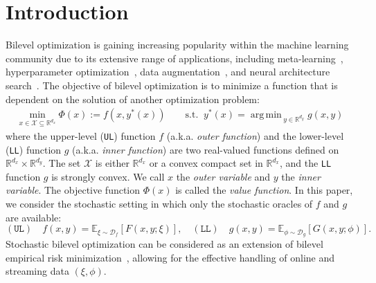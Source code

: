 \documentclass[10pt]{article}
\theoremstyle{remark}
\newcommand{\cD}{\mathcal{D}}
\newcommand{\cX}{\mathcal{X}}
\newcommand{\realset}{\mathbb{R}}
\newcommand{\E}{\mathbb{E}}
\DeclareMathOperator*{\argmin}{arg\,min\,}
\begin{document}
\section{Introduction}
Bilevel optimization is gaining increasing popularity within the machine learning community due to its extensive range of applications, including meta-learning~\cite{bertinetto2018meta, franceschi2018bilevel, rajeswaran2019meta, ji2020convergence}, hyperparameter optimization~\cite{bengio2000gradient,franceschi2018bilevel,bertrand2020implicit}, data augmentation~\cite{cubuk2019autoaugment, rommel2022cadda}, and neural architecture search~\cite{liudarts19, zhangadvancing22}. The objective of bilevel optimization is to minimize a function that is dependent on the solution of another optimization problem:
\begin{equation}\label{eq: bo}
    \begin{aligned}
        \min_{x\in \cX \subseteq \realset^{d_x}} \Phi(x) := f(x, y^*(x)) \qquad \text{s.t. }\ y^*(x) = \argmin_{y\in \realset^{d_y}} g(x, y)
    \end{aligned}
\end{equation}
where the upper-level (\texttt{UL}) function $f$ (a.k.a. \emph{outer function}) and the lower-level (\texttt{LL}) function $g$ (a.k.a. \emph{inner function}) are two real-valued functions defined on $\realset^{d_x} \times \realset^{d_y}$. The set $\cX$ is either $\realset^{d_x}$ or a convex compact set in $\realset^{d_x}$, and the \texttt{LL} function $g$ is strongly convex. We call $x$ the \emph{outer variable} and $y$ the \emph{inner variable}. The objective function 
 $\Phi(x)$ is called the \emph{value function}. In this paper, we consider the stochastic setting in which only the stochastic oracles of $f$ and $g$ are available:
 \begin{equation}\label{eq: stochastic setting}
    \mathrm{(\texttt{UL})}\quad f(x, y) = \E_{\xi\sim \cD_f}\left[ F(x, y; \xi) \right],\quad \mathrm{(\texttt{LL})}\quad g(x, y) = \E_{\phi\sim \cD_g}\left[ G(x, y; \phi) \right].
 \end{equation}
 Stochastic bilevel optimization can be considered as an extension of bilevel empirical risk minimization~\cite{dagreou2023lower}, allowing for the effective handling of online and streaming data $(\xi, \phi)$. 
 
\end{document}
